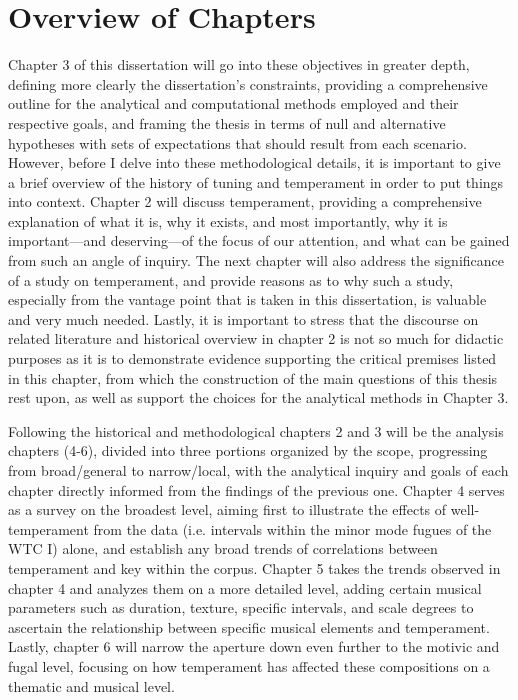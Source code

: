     \section{Overview of Chapters}\label{overview-of-chapters}

Chapter 3 of this dissertation will go into these objectives in greater
depth, defining more clearly the dissertation's constraints, providing a
comprehensive outline for the analytical and computational methods
employed and their respective goals, and framing the thesis in terms of
null and alternative hypotheses with sets of expectations that should
result from each scenario. However, before I delve into these
methodological details, it is important to give a brief overview of the
history of tuning and temperament in order to put things into context.
Chapter 2 will discuss temperament, providing a comprehensive
explanation of what it is, why it exists, and most importantly, why it
is important---and deserving---of the focus of our attention, and what
can be gained from such an angle of inquiry. The next chapter will also
address the significance of a study on temperament, and provide reasons
as to why such a study, especially from the vantage point that is taken
in this dissertation, is valuable and very much needed. Lastly, it is
important to stress that the discourse on related literature and
historical overview in chapter 2 is not so much for didactic purposes as
it is to demonstrate evidence supporting the critical premises listed in
this chapter, from which the construction of the main questions of this
thesis rest upon, as well as support the choices for the analytical
methods in Chapter 3.

Following the historical and methodological chapters 2 and 3 will be the
analysis chapters (4-6), divided into three portions organized by the
scope, progressing from broad/general to narrow/local, with the
analytical inquiry and goals of each chapter directly informed from the
findings of the previous one. Chapter 4 serves as a survey on the
broadest level, aiming first to illustrate the effects of
well-temperament from the data (i.e. intervals within the minor mode
fugues of the WTC I) alone, and establish any broad trends of
correlations between temperament and key within the corpus. Chapter 5
takes the trends observed in chapter 4 and analyzes them on a more
detailed level, adding certain musical parameters such as duration,
texture, specific intervals, and scale degrees to ascertain the
relationship between specific musical elements and temperament. Lastly,
chapter 6 will narrow the aperture down even further to the motivic and
fugal level, focusing on how temperament has affected these compositions
on a thematic and musical level.

